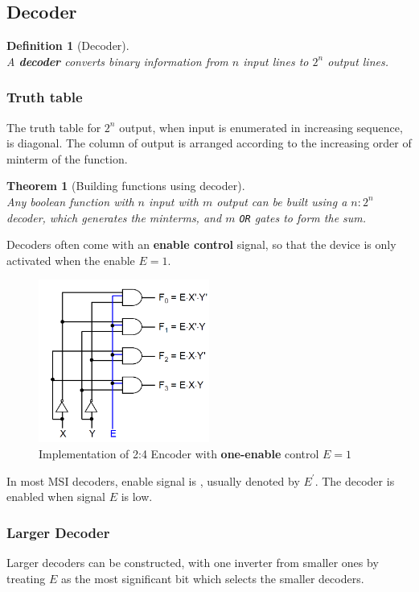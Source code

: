 \documentclass[12pt]{article}
\newtheorem{definition}{Definition}[section]
\newtheorem{theorem}{Theorem}[section]
\theoremstyle{definition}
\begin{document}
\subsection{Decoder}
\begin{definition}[Decoder]
\hfill\\\normalfont A \textbf{decoder} converts binary information from $n$ input lines to $2^n$ output lines.
\end{definition}
\subsubsection{Truth table}
The truth table for $2^n$ output, when input is enumerated in increasing sequence, is diagonal. The column of output is arranged according to the increasing order of minterm of the function.\\

\begin{theorem}[Building functions using decoder]\hfill\\\normalfont
Any boolean function with $n$ input with $m$ output can be built using a $n:2^n$ decoder, which generates the minterms, and $m$ \texttt{OR} gates to form the sum.
\end{theorem}

Decoders often come with an \textbf{enable control} signal, so that the device is only activated when the enable $E = 1$. \\
\begin{figure}[h]
\centering
\includegraphics[width = 0.5\textwidth]{7_1.png}
\caption{Implementation of 2:4 Encoder with \textbf{one-enable} control $E=1$}
\end{figure}
In most MSI decoders, enable signal is , usually denoted by $E^\prime$. The decoder is enabled when signal $E$ is low.\\
\subsubsection{Larger Decoder}
Larger decoders can be constructed, with one inverter from smaller ones by treating $E$ as the most significant bit which selects the smaller decoders.
\end{document}
